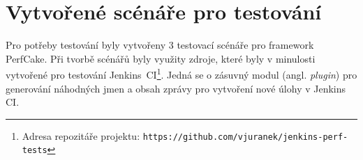 \chapter{Vytvořené scénáře pro testování} \label{prilohaScenare}
    Pro potřeby testování byly vytvořeny 3 testovací scénáře pro framework PerfCake. 
    Při tvorbě scénářů byly využity zdroje, které byly v minulosti vytvořené pro testování 
    Jenkins~CI\footnote{Adresa repozitáře projektu: 
    \texttt{https://github.com/vjuranek/jenkins-perf-tests}}.
    Jedná se o zásuvný modul (angl. \emph{plugin}) pro 
    generování náhodných jmen a obsah zprávy pro vytvoření nové úlohy v Jenkins CI. 

    \medskip

